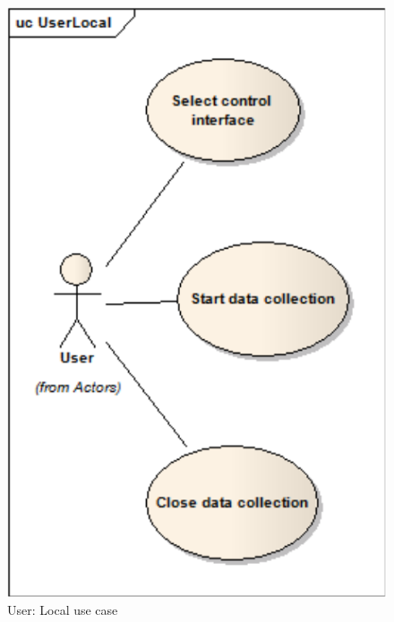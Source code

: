 \begin{figure}[!htbp]
\center
\begin{minipage}{0.45\linewidth}
\center
\captionsetup{justification=centering,margin=0.5cm,font=small}
\includegraphics[width=0.75\linewidth]{img/cap4/userCaseLocal}
\caption{User: Local use case} \label{subfig:userCaseLocal}
\end{minipage}
\begin{minipage}{0.45\linewidth}
\center
\captionsetup{justification=centering,margin=0cm,font=small}

\end{minipage}
\end{figure}
